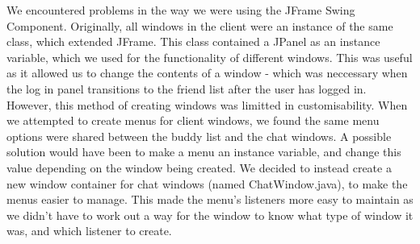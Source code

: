 We encountered problems in the way we were using the JFrame Swing Component. Originally, all windows in the client were an instance of the same class, which extended JFrame. This class contained a JPanel as an instance variable, which we used for the functionality of different windows. This was useful as it allowed us to change the contents of a window - which was neccessary when the log in panel transitions to the friend list after the user has logged in. However, this method of creating windows was limitted in customisability. When we attempted to create menus for client windows, we found the same menu options were shared between the buddy list and the chat windows. A possible solution would have been to make a menu an instance variable, and change this value depending on the window being created. We decided to instead create a new window container for chat windows (named ChatWindow.java), to make the menus easier to manage. This made the menu's listeners more easy to maintain as we didn't have to work out a way for the window to know what type of window it was, and which listener to create.   


